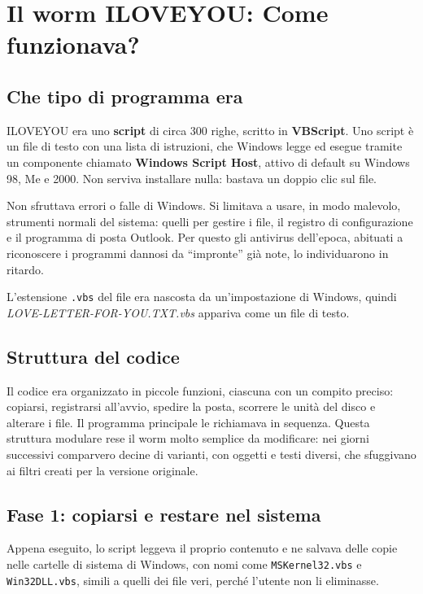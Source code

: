\section{Il worm ILOVEYOU: Come funzionava?}

\subsection{Che tipo di programma era}

ILOVEYOU era uno \textbf{script} di circa 300 righe, scritto in \textbf{VBScript}. Uno script è un file di testo con una lista di istruzioni, che Windows legge ed esegue tramite un componente chiamato \textbf{Windows Script Host}, attivo di default su Windows 98, Me e 2000. Non serviva installare nulla: bastava un doppio clic sul file.

Non sfruttava errori o falle di Windows. Si limitava a usare, in modo malevolo, strumenti normali del sistema: quelli per gestire i file, il registro di configurazione e il programma di posta Outlook. Per questo gli antivirus dell'epoca, abituati a riconoscere i programmi dannosi da ``impronte'' già note, lo individuarono in ritardo.

L'estensione \texttt{.vbs} del file era nascosta da un'impostazione di Windows, quindi \textit{LOVE-LETTER-FOR-YOU.TXT.vbs} appariva come un file di testo.

\subsection{Struttura del codice}

Il codice era organizzato in piccole funzioni, ciascuna con un compito preciso: copiarsi, registrarsi all'avvio, spedire la posta, scorrere le unità del disco e alterare i file. Il programma principale le richiamava in sequenza. Questa struttura modulare rese il worm molto semplice da modificare: nei giorni successivi comparvero decine di varianti, con oggetti e testi diversi, che sfuggivano ai filtri creati per la versione originale.

\subsection{Fase 1: copiarsi e restare nel sistema}

Appena eseguito, lo script leggeva il proprio contenuto e ne salvava delle copie nelle cartelle di sistema di Windows, con nomi come \texttt{MSKernel32.vbs} e \texttt{Win32DLL.vbs}, simili a quelli dei file veri, perché l'utente non li eliminasse.

